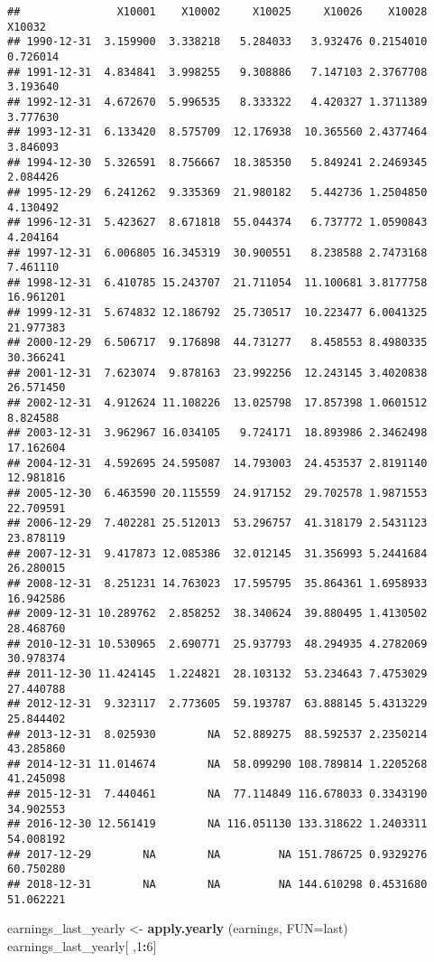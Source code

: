 \documentclass[
]{article}
\newenvironment{Shaded}{\begin{snugshade}}{\end{snugshade}}
\newcommand{\AttributeTok}[1]{\textcolor[rgb]{0.13,0.29,0.53}{#1}}
\newcommand{\DecValTok}[1]{\textcolor[rgb]{0.00,0.00,0.81}{#1}}
\newcommand{\FunctionTok}[1]{\textcolor[rgb]{0.13,0.29,0.53}{\textbf{#1}}}
\newcommand{\NormalTok}[1]{#1}
\newcommand{\OtherTok}[1]{\textcolor[rgb]{0.56,0.35,0.01}{#1}}
\newcommand{\SpecialCharTok}[1]{\textcolor[rgb]{0.81,0.36,0.00}{\textbf{#1}}}
\begin{document}
\begin{verbatim}
##               X10001    X10002     X10025     X10026    X10028    X10032
## 1990-12-31  3.159900  3.338218   5.284033   3.932476 0.2154010  0.726014
## 1991-12-31  4.834841  3.998255   9.308886   7.147103 2.3767708  3.193640
## 1992-12-31  4.672670  5.996535   8.333322   4.420327 1.3711389  3.777630
## 1993-12-31  6.133420  8.575709  12.176938  10.365560 2.4377464  3.846093
## 1994-12-30  5.326591  8.756667  18.385350   5.849241 2.2469345  2.084426
## 1995-12-29  6.241262  9.335369  21.980182   5.442736 1.2504850  4.130492
## 1996-12-31  5.423627  8.671818  55.044374   6.737772 1.0590843  4.204164
## 1997-12-31  6.006805 16.345319  30.900551   8.238588 2.7473168  7.461110
## 1998-12-31  6.410785 15.243707  21.711054  11.100681 3.8177758 16.961201
## 1999-12-31  5.674832 12.186792  25.730517  10.223477 6.0041325 21.977383
## 2000-12-29  6.506717  9.176898  44.731277   8.458553 8.4980335 30.366241
## 2001-12-31  7.623074  9.878163  23.992256  12.243145 3.4020838 26.571450
## 2002-12-31  4.912624 11.108226  13.025798  17.857398 1.0601512  8.824588
## 2003-12-31  3.962967 16.034105   9.724171  18.893986 2.3462498 17.162604
## 2004-12-31  4.592695 24.595087  14.793003  24.453537 2.8191140 12.981816
## 2005-12-30  6.463590 20.115559  24.917152  29.702578 1.9871553 22.709591
## 2006-12-29  7.402281 25.512013  53.296757  41.318179 2.5431123 23.878119
## 2007-12-31  9.417873 12.085386  32.012145  31.356993 5.2441684 26.280015
## 2008-12-31  8.251231 14.763023  17.595795  35.864361 1.6958933 16.942586
## 2009-12-31 10.289762  2.858252  38.340624  39.880495 1.4130502 28.468760
## 2010-12-31 10.530965  2.690771  25.937793  48.294935 4.2782069 30.978374
## 2011-12-30 11.424145  1.224821  28.103132  53.234643 7.4753029 27.440788
## 2012-12-31  9.323117  2.773605  59.193787  63.888145 5.4313229 25.844402
## 2013-12-31  8.025930        NA  52.889275  88.592537 2.2350214 43.285860
## 2014-12-31 11.014674        NA  58.099290 108.789814 1.2205268 41.245098
## 2015-12-31  7.440461        NA  77.114849 116.678033 0.3343190 34.902553
## 2016-12-30 12.561419        NA 116.051130 133.318622 1.2403311 54.008192
## 2017-12-29        NA        NA         NA 151.786725 0.9329276 60.750280
## 2018-12-31        NA        NA         NA 144.610298 0.4531680 51.062221
\end{verbatim}

\begin{Shaded}
\begin{Highlighting}[]
\NormalTok{earnings\_last\_yearly }\OtherTok{\textless{}{-}} \FunctionTok{apply.yearly}\NormalTok{ (earnings, }\AttributeTok{FUN=}\NormalTok{last)}
\NormalTok{earnings\_last\_yearly[ ,}\DecValTok{1}\SpecialCharTok{:}\DecValTok{6}\NormalTok{]}
\end{Highlighting}
\end{Shaded}
\end{document}
